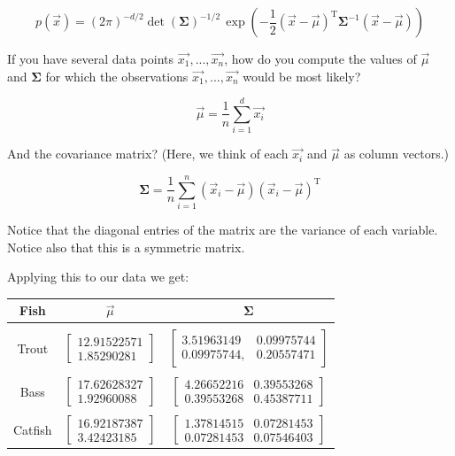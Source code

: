 $$p(\vec{x}) = (2\pi)^{-d/2}\det (\boldsymbol\Sigma)^{-1/2} \, \exp \left( -\frac{1}{2} (\vec{x} - \vec\mu)^\mathrm{T} \boldsymbol\Sigma^{-1}(\vec{x} - \vec\mu) \right)$$

If you have several data points $\vec{x_1}, ..., \vec{x_n}$, how do you  compute the values of $\vec{\mu}$ and $\boldsymbol\Sigma$ for which the observations $\vec{x_1}, ..., \vec{x_n}$ would be most likely?

$$\vec{\mu} = \frac{1}{n} \sum_{i = 1}^{d} \vec{x_i}$$

And the covariance matrix?  (Here, we think of each $\vec{x_i}$  and $\vec{\mu}$ as  column vectors.)

$$\boldsymbol\Sigma = \frac{1}{n}\sum_{i=1}^n (\vec{x}_i-\vec{\mu})(\vec{x}_i-\vec{\mu})^\mathrm{T}$$

Notice that the diagonal entries of the matrix are the variance of each variable.  Notice also that this is a symmetric matrix.

Applying this to our data we get:


\begin{tabular}{c | c | c}
Fish & $\vec{\mu}$  &$\boldsymbol\Sigma$ \\
\hline   & &\\
Trout & $\begin{bmatrix}
 12.91522571\\1.85290281
 \end{bmatrix}$ & 
$\begin{bmatrix}
3.51963149 & 0.09975744 \\
 0.09975744, & 0.20557471
 \end{bmatrix}$ \\ & & \\
Bass  & $\begin{bmatrix}
  17.62628327 \\ 1.92960088
 \end{bmatrix}$ & 
$\begin{bmatrix}
4.26652216 & 0.39553268 \\
0.39553268 & 0.45387711
 \end{bmatrix}$\\ & & \\
 
 Catfish  & $\begin{bmatrix}16.92187387 \\ 3.42423185
 \end{bmatrix}$ & 
$\begin{bmatrix}
1.37814515 &0.07281453 \\
0.07281453 & 0.07546403
 \end{bmatrix}$\\
\end{tabular}


